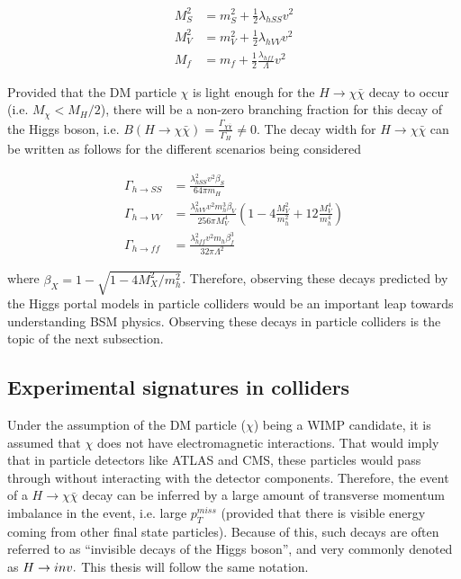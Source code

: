 \begin{equation}
    \begin{split}
        M_{S}^2 &= m_{S}^2 + \frac{1}{2} \lambda_{hSS} v^{2} \\
        M_{V}^2 &= m_{V}^2 + \frac{1}{2} \lambda_{hVV} v^{2} \\
        M_{f}   &= m_{f}   + \frac{1}{2} \frac{\lambda_{hff}}{\Lambda} v^{2}
    \end{split}
\end{equation}

Provided that the DM particle $\chi$ is light enough for the $H \rightarrow \chi \bar{\chi}$ decay to occur (i.e. $M_{\chi} < M_{H} / 2$), there will be a non-zero
branching fraction for this decay of the Higgs boson, i.e. $B(H \rightarrow \chi \bar{\chi}) = \frac{\Gamma_{\chi\bar{\chi}}}{\Gamma_{H}} \neq 0$. The decay width for
$H \rightarrow \chi \bar{\chi}$ can be written as follows for the different scenarios being considered~\cite{Djouadi:2011aa}

\begin{equation}
    \begin{split}
        \Gamma_{h \rightarrow SS} &= \frac{\lambda_{hSS}^{2} v^{2} \beta_{S}}{64 \pi m_{H}} \\
        \Gamma_{h \rightarrow VV} &= \frac{\lambda_{hVV}^{2} v^{2} m_{h}^{3} \beta_{V}}{256 \pi M_{V}^{4}} \left( 1 - 4 \frac{M_V^2}{m_h^2} + 12 \frac{M_V^4}{m_h^4} \right) \\
        \Gamma_{h \rightarrow ff} &= \frac{\lambda_{hff}^{2} v^{2} m_{h} \beta_{f}^{3}}{32 \pi \Lambda^{2}}
    \end{split}
\end{equation}

where $\beta_{X} = 1 - \sqrt{1 - 4 M_X^2 / m_h^2}$. 
Therefore, observing these decays predicted by the Higgs portal models in particle colliders would be an important
leap towards understanding BSM physics. Observing these decays in particle colliders is the topic of the next subsection.

\subsection{Experimental signatures in colliders}
\label{subsec:exp_signatures}

Under the assumption of the DM particle ($\chi$) being a WIMP candidate, it is assumed that $\chi$ does not have electromagnetic interactions. That would imply
that in particle detectors like ATLAS and CMS, these particles would pass through without interacting with the detector components. Therefore, the event of a
$H \rightarrow \chi \bar{\chi}$ decay can be inferred by a large amount of transverse momentum imbalance in the event, i.e. large $p_T^{miss}$ (provided that there
is visible energy coming from other final state particles). Because of this, such decays are often referred to as ``invisible decays of the Higgs boson'', and very
commonly denoted as $H \rightarrow inv.$ This thesis will follow the same notation.

